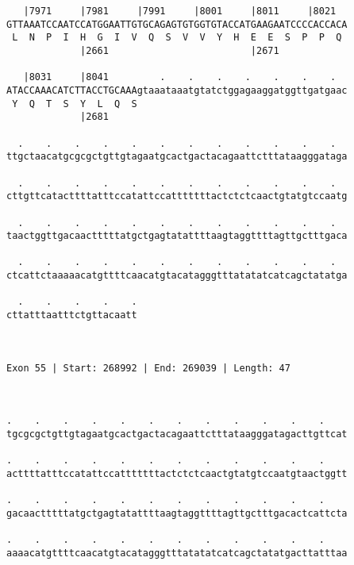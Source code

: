 \documentclass{article}
\begin{document}
\begin{Verbatim}
   |7971     |7981     |7991     |8001     |8011     |8021  
GTTAAATCCAATCCATGGAATTGTGCAGAGTGTGGTGTACCATGAAGAATCCCCACCACA
 L  N  P  I  H  G  I  V  Q  S  V  V  Y  H  E  E  S  P  P  Q 
             |2661                         |2671            
  
   |8031     |8041         .    .    .    .    .    .    .  
ATACCAAACATCTTACCTGCAAAgtaaataaatgtatctggagaaggatggttgatgaac
 Y  Q  T  S  Y  L  Q  S                                     
             |2681                                          
  
  .    .    .    .    .    .    .    .    .    .    .    .  
ttgctaacatgcgcgctgttgtagaatgcactgactacagaattctttataagggataga
                                                            
  .    .    .    .    .    .    .    .    .    .    .    .  
cttgttcatacttttatttccatattccatttttttactctctcaactgtatgtccaatg
                                                            
  .    .    .    .    .    .    .    .    .    .    .    .  
taactggttgacaactttttatgctgagtatattttaagtaggttttagttgctttgaca
                                                            
  .    .    .    .    .    .    .    .    .    .    .    .  
ctcattctaaaaacatgttttcaacatgtacatagggtttatatatcatcagctatatga
                                                            
  .    .    .    .    .
cttatttaatttctgttacaatt
                       
                       
 
Exon 55 | Start: 268992 | End: 269039 | Length: 47



.    .    .    .    .    .    .    .    .    .    .    .    
tgcgcgctgttgtagaatgcactgactacagaattctttataagggatagacttgttcat
                                                            
.    .    .    .    .    .    .    .    .    .    .    .    
acttttatttccatattccatttttttactctctcaactgtatgtccaatgtaactggtt
                                                            
.    .    .    .    .    .    .    .    .    .    .    .    
gacaactttttatgctgagtatattttaagtaggttttagttgctttgacactcattcta
                                                            
.    .    .    .    .    .    .    .    .    .    .    .    
aaaacatgttttcaacatgtacatagggtttatatatcatcagctatatgacttatttaa
                                                            

\end{Verbatim}
\end{document}
